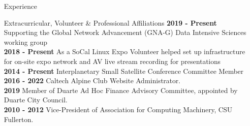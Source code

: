 \documentclass{resume} %
\begin{document}
\begin{rSection}{Experience}



\begin{rSection}{ Extracurricular, Volunteer \& Professional Affiliations}
{\bf 2019 - Present} Supporting the Global Network Advancement (GNA-G) Data Intensive Sciences working group \\
{\bf 2018 - Present} As a SoCal Linux Expo Volunteer helped set up infrastructure for on-site expo network and A\/V live stream recording for presentations\\
{\bf 2014 - Present} Interplanetary Small Satellite Conference Committee Member\\
{\bf 2016 - 2022} Caltech Alpine Club Website Administrator. \\
{\bf 2019} Member of Duarte Ad Hoc Finance Advisory Committee, appointed by Duarte City Council. \\
{\bf 2010 - 2012} Vice-President of Association for Computing Machinery, CSU Fullerton. 
\end{rSection}





\end{rSection}
\end{document}
